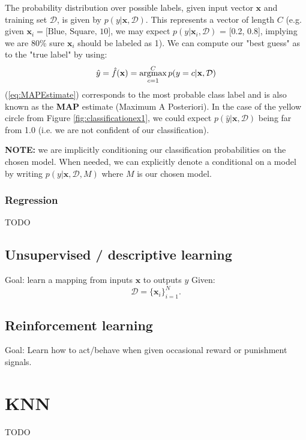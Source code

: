 \documentclass[12pt]{article}
\newcommand{\argmax}{\operatornamewithlimits{argmax}}
\begin{document}
The probability distribution over possible labels, given input vector \(\mathbf{x}\) and training set \(\mathcal{D}\), is given by \(p(y|\textbf{x},\mathcal{D}) \). This represents a vector of length \(C\) (e.g. given \(\mathbf{x}_i = \text{[Blue, Square, 10]}\), we may expect \(p(y|\mathbf{x}_i,\mathcal{D}) \) = [0.2, 0.8], implying we are 80\% sure \(\mathbf{x}_i\) should be labeled as 1). We can compute our "best guess" as to the "true label" by using:
\begin{equation}
\hat{y} = \hat{f}(\mathbf{x}) = \argmax_{c=1}^C p(y = c|\mathbf{x},\mathcal{D})
\label{eq:MAPEstimate}
\end{equation}
(\ref{eq:MAPEstimate}) corresponds to the most probable class label and is also known as the \textbf{MAP} estimate (Maximum A Posteriori). In the case of the yellow circle from Figure \ref{fig:classificationex1}, we could expect \(p(\hat{y}|\mathbf{x},\mathcal{D})\) being far from 1.0 (i.e. we are not confident of our classification).

\textbf{NOTE:} we are implicitly conditioning our classification probabilities on the chosen model. When needed, we can explicitly denote a conditional on a model by writing \(p(y|\textbf{x},\mathcal{D}, M)\) where \(M\) is our chosen model. 

\subsubsection{Regression}
TODO

\subsection{Unsupervised / descriptive learning}
Goal: learn a mapping from inputs \(\mathbf{x}\) to outputs \(y\)
\newline
Given:
\[
    \mathcal{D} = \lbrace \mathbf{x}_i \rbrace_{i=1}^{N}.
\]

\subsection{Reinforcement learning}
Goal: Learn how to act/behave when given occasional reward or punishment signals.

\section{KNN}
TODO

\printbibliography
\end{document}
